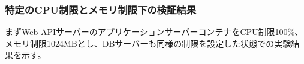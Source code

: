 \documentclass[../../../../main]{subfiles}
\begin{document}
    \subsubsection{特定のCPU制限とメモリ制限下の検証結果}\label{subsubsec:result-streaming-only-limit}

    まずWeb APIサーバーのアプリケーションサーバーコンテナをCPU制限100\%、メモリ制限1024MBとし、DBサーバーも同様の制限を設定した状態での実験結果を示す。

    

    

    

    

    
\end{document}
